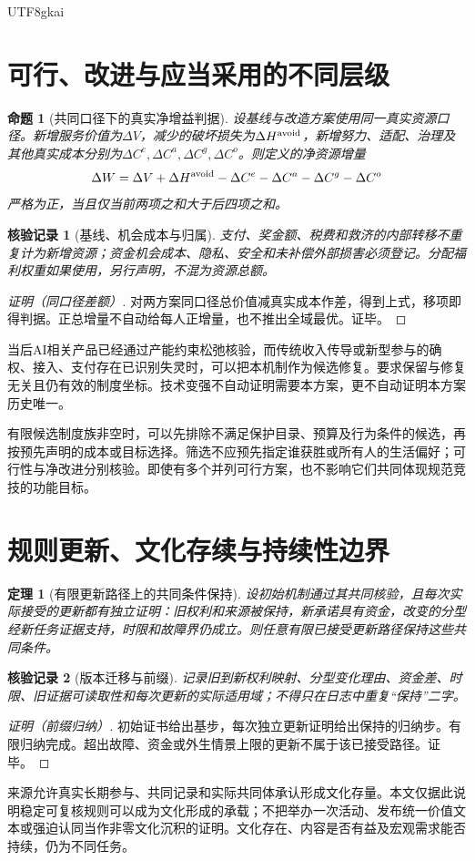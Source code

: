 \documentclass[12pt,a4paper,openany]{report}
\newtheorem{theorem}{定理}[chapter]
\newtheorem{proposition}{命题}[chapter]
\newtheorem{Certificate}{核验记录}[chapter]
\begin{document}
\begin{CJK*}{UTF8}{gkai}
\section{可行、改进与应当采用的不同层级}
\begin{proposition}[共同口径下的真实净增益判据]
\label{prop:welfare}
设基线与改造方案使用同一真实资源口径。新增服务价值为$\Delta V$，减少的破坏损失为$\Delta H^{\rm avoid}$，新增努力、适配、治理及其他真实成本分别为$\Delta C^e,\Delta C^a,\Delta C^g,\Delta C^o$。则定义的净资源增量
\[
 \Delta W=\Delta V+\Delta H^{\rm avoid}
 -\Delta C^e-\Delta C^a-\Delta C^g-\Delta C^o
\]
严格为正，当且仅当前两项之和大于后四项之和。
\end{proposition}
\begin{Certificate}[基线、机会成本与归属]
支付、奖金额、税费和救济的内部转移不重复计为新增资源；资金机会成本、隐私、安全和未补偿外部损害必须登记。分配福利权重如果使用，另行声明，不混为资源总额。
\end{Certificate}
\begin{proof}[证明（同口径差额）]
对两方案同口径总价值减真实成本作差，得到上式，移项即得判据。正总增量不自动给每人正增量，也不推出全域最优。证毕。
\end{proof}

当后AI相关产品已经通过产能约束松弛核验，而传统收入传导或新型参与的确权、接入、支付存在已识别失灵时，可以把本机制作为候选修复。\cite[“后 AI 条件触发后的最小兼容适用路径”]{SourceMarket}要求保留与修复无关且仍有效的制度坐标。技术变强不自动证明需要本方案，更不自动证明本方案历史唯一。

有限候选制度族非空时，可以先排除不满足保护目录、预算及行为条件的候选，再按预先声明的成本或目标选择。筛选不应预先指定谁获胜或所有人的生活偏好；可行性与净改进分别核验。即使有多个并列可行方案，也不影响它们共同体现规范竞技的功能目标。

\section{规则更新、文化存续与持续性边界}
\begin{theorem}[有限更新路径上的共同条件保持]
\label{thm:update}
设初始机制通过其共同核验，且每次实际接受的更新都有独立证明：旧权利和来源被保持，新承诺具有资金，改变的分型经新任务证据支持，时限和故障界仍成立。则任意有限已接受更新路径保持这些共同条件。
\end{theorem}
\begin{Certificate}[版本迁移与前缀]
记录旧到新权利映射、分型变化理由、资金差、时限、旧证据可读取性和每次更新的实际适用域；不得只在日志中重复“保持”二字。
\end{Certificate}
\begin{proof}[证明（前缀归纳）]
初始证书给出基步，每次独立更新证明给出保持的归纳步。有限归纳完成。超出故障、资金或外生情景上限的更新不属于该已接受路径。证毕。
\end{proof}
来源\cite[“可观测文化状态与参与沉积”]{SourceMarket}允许真实长期参与、共同记录和实际共同体承认形成文化存量。本文仅据此说明稳定可复核规则可以成为文化形成的承载；不把举办一次活动、发布统一价值文本或强迫认同当作非零文化沉积的证明。文化存在、内容是否有益及宏观需求能否持续，仍为不同任务。


\end{CJK*}
\end{document}
